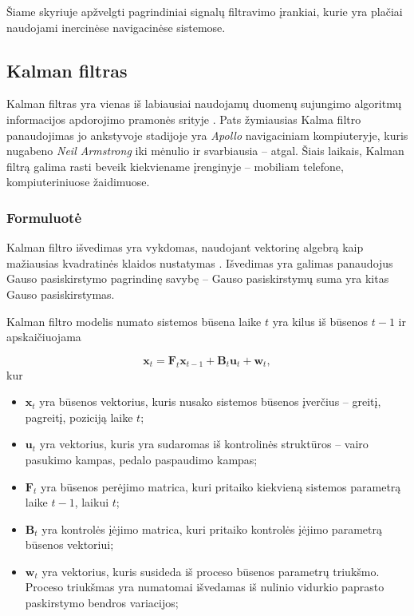 Šiame skyriuje apžvelgti pagrindiniai signalų filtravimo įrankiai, kurie yra plačiai naudojami inercinėse navigacinėse sistemose.

\subsection{Kalman filtras}
    
    Kalman filtras \cite{kalman1960new} yra vienas iš labiausiai naudojamų duomenų sujungimo algoritmų informacijos apdorojimo pramonės srityje \cite{faragher2012understanding}. Pats žymiausias Kalma filtro panaudojimas jo ankstyvoje stadijoje yra \textit{Apollo} navigaciniam kompiuteryje, kuris nugabeno \textit{Neil Armstrong} iki mėnulio ir svarbiausia -- atgal. Šiais laikais, Kalman filtrą galima rasti beveik kiekviename įrenginyje -- mobiliam telefone, kompiuteriniuose žaidimuose.

\subsubsection{Formuluotė}

    Kalman filtro išvedimas yra vykdomas, naudojant vektorinę algebrą kaip mažiausias kvadratinės klaidos nustatymas \cite{bibby1977prediction}. Išvedimas yra galimas panaudojus Gauso pasiskirstymo pagrindinę savybę -- Gauso pasiskirstymų suma yra kitas Gauso pasiskirstymas.

    Kalman filtro modelis numato sistemos būsena laike $t$ yra kilus iš būsenos $t-1$ ir apskaičiuojama

    \begin{equation}
        \label{eq:kalman}
        \mathbf{x}_t = \mathbf{F}_t\mathbf{x}_{t-1} + \mathbf{B}_t\mathbf{u}_t + \mathbf{w}_t,
    \end{equation}
    kur 
    \begin{itemize}
        \item $\mathbf{x}_t$ yra būsenos vektorius, kuris nusako sistemos būsenos įverčius -- greitį, pagreitį, poziciją laike $t$;
        \item $\mathbf{u}_t$ yra vektorius, kuris yra sudaromas iš kontrolinės struktūros -- vairo pasukimo kampas, pedalo paspaudimo kampas;
        \item $\mathbf{F}_t$ yra būsenos perėjimo matrica, kuri pritaiko kiekvieną sistemos parametrą laike $t-1$, laikui $t$;
        \item $\mathbf{B}_t$ yra kontrolės įėjimo matrica, kuri pritaiko kontrolės įėjimo parametrą būsenos vektoriui;
        \item $\mathbf{w}_t$ yra vektorius, kuris susideda iš proceso būsenos parametrų triukšmo. Proceso triukšmas yra numatomai išvedamas iš nulinio vidurkio paprasto paskirstymo bendros variacijos;
    \end{itemize}

